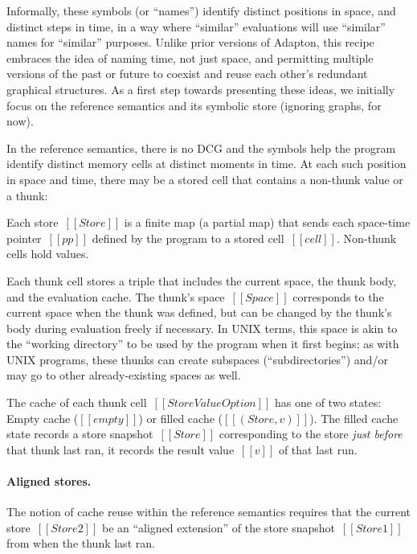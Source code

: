 \documentclass[11pt]{article}
\begin{document}
Informally, these symbols (or ``names'') identify distinct positions
in space, and distinct steps in time, in a way where ``similar''
evaluations will use ``similar'' names for ``similar'' purposes.
%
Unlike prior versions of Adapton, this recipe embraces the idea of
naming time, not just space, and permitting multiple versions of the
past or future to coexist and reuse each other's redundant graphical
structures.
%
As a first step towards presenting these ideas, we initially focus on
the reference semantics and its symbolic store (ignoring graphs, for
now).

In the reference semantics, there is no DCG and the symbols help the
program identify distinct memory cells at distinct moments in time.
%
At each such position in space and time, there may be a stored cell
that contains a non-thunk value or a thunk:


\ottgrammartabular{\ottStore}
\ottgrammartabular{\ottcell}
\ottgrammartabular{\ottStoreValueOption}

Each store~$[[Store]]$ is a finite map (a partial map) that sends each space-time pointer~$[[pp]]$
defined by the program to a stored cell~$[[cell]]$.
%
Non-thunk cells hold values.

Each thunk cell stores a triple that includes the current space, the thunk body, and the evaluation cache.
%
The thunk's space~$[[Space]]$ corresponds to the current
space when the thunk was defined, but can be changed by the thunk's body during
evaluation freely if necessary.
%
In UNIX terms, this space is akin to the ``working directory'' to be
used by the program when it first begins; as with UNIX programs, these
thunks can create subspaces (``subdirectories'') and/or may go to
other already-existing spaces as well.

The cache of each thunk cell~$[[StoreValueOption]]$ has one of two states:
Empty cache ($[[empty]]$) or
filled cache ($[[(Store, v)]]$).
%
The filled cache state records a store snapshot~$[[Store]]$
corresponding to the store \emph{just before} that thunk last ran,
it records the result value~$[[v]]$ of that last run.

\paragraph{Aligned stores.}

The notion of cache reuse within the reference semantics requires that
the current store~$[[Store2]]$ be an ``aligned extension'' of the store
snapshot~$[[Store1]]$ from when the thunk last ran.
\end{document}
